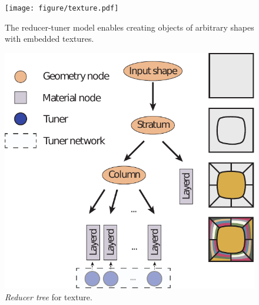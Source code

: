 \begin{figure}[t]
\centering
\texttt{[image: figure/texture.pdf]}
\caption {The reducer-tuner model enables creating objects of arbitrary shapes with embedded textures.}
\label{fig:textured}
\end{figure}

\begin{figure}[t]
\centering
\includegraphics*[scale=0.7]{figure/treeTexture.pdf}
\caption{\emph{Reducer tree} for texture.}
\label{fig:treeTexture}
\end{figure}

